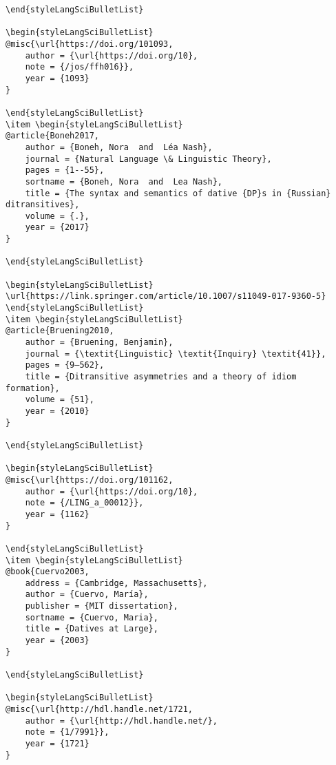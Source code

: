 \documentclass[output=paper,modfonts,nonflat,
 hidelinks
]{langsci/langscibook}
\begin{document}
\begin{verbatim}
\end{styleLangSciBulletList}

\begin{styleLangSciBulletList}
@misc{\url{https://doi.org/101093,
	author = {\url{https://doi.org/10},
	note = {/jos/ffh016}},
	year = {1093}
}

\end{styleLangSciBulletList}
\item \begin{styleLangSciBulletList}
@article{Boneh2017,
	author = {Boneh, Nora  and  Léa Nash},
	journal = {Natural Language \& Linguistic Theory},
	pages = {1--55},
	sortname = {Boneh, Nora  and  Lea Nash},
	title = {The syntax and semantics of dative {DP}s in {Russian} ditransitives},
	volume = {.},
	year = {2017}
}

\end{styleLangSciBulletList}

\begin{styleLangSciBulletList}
\url{https://link.springer.com/article/10.1007/s11049-017-9360-5}
\end{styleLangSciBulletList}
\item \begin{styleLangSciBulletList}
@article{Bruening2010,
	author = {Bruening, Benjamin},
	journal = {\textit{Linguistic} \textit{Inquiry} \textit{41}},
	pages = {9–562},
	title = {Ditransitive asymmetries and a theory of idiom formation},
	volume = {51},
	year = {2010}
}

\end{styleLangSciBulletList}

\begin{styleLangSciBulletList}
@misc{\url{https://doi.org/101162,
	author = {\url{https://doi.org/10},
	note = {/LING_a_00012}},
	year = {1162}
}

\end{styleLangSciBulletList}
\item \begin{styleLangSciBulletList}
@book{Cuervo2003,
	address = {Cambridge, Massachusetts},
	author = {Cuervo, María},
	publisher = {MIT dissertation},
	sortname = {Cuervo, Maria},
	title = {Datives at Large},
	year = {2003}
}

\end{styleLangSciBulletList}

\begin{styleLangSciBulletList}
@misc{\url{http://hdl.handle.net/1721,
	author = {\url{http://hdl.handle.net/},
	note = {1/7991}},
	year = {1721}
}


\end{verbatim}
\end{document}
